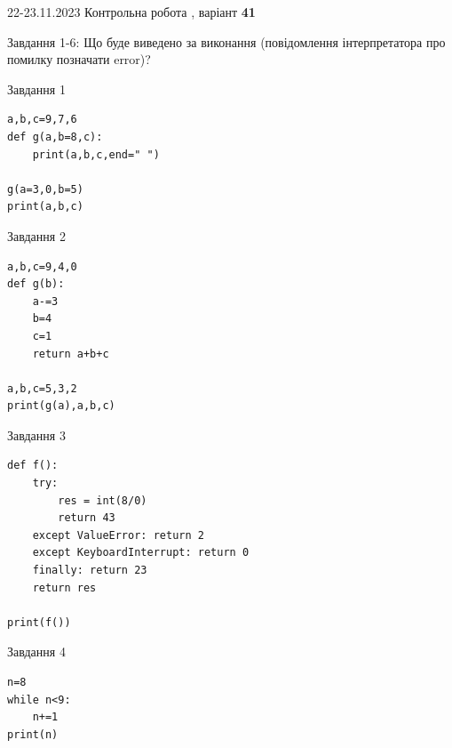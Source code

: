 \documentclass[12pt, ukrainian]{article}
\begin{document}
{{22-23.11.2023 Контрольна робота , варіант  \No \textbf { 41 }\par}}
{

Завдання 1-6: Що буде виведено за виконання (повідомлення інтерпретатора про помилку позначати error)?


\begin{minipage}[t]{9.7cm}                
{\begin{center}Завдання {1}\end{center}}
\begin{verbatim}
a,b,c=9,7,6
def g(a,b=8,c):
    print(a,b,c,end=" ")

g(a=3,0,b=5)
print(a,b,c)
\end{verbatim}     
\end{minipage}
\vline \hspace{8mm}
\begin{minipage}[t]{8.0cm}                
{\begin{center}Завдання {2}\end{center}}
\begin{verbatim}
a,b,c=9,4,0
def g(b):
    a-=3
    b=4
    c=1
    return a+b+c

a,b,c=5,3,2
print(g(a),a,b,c)
\end{verbatim}     
\end{minipage}

\vspace{15mm}
\begin{minipage}[t]{9.7cm}                
{\begin{center}Завдання {3}\end{center}}
\begin{verbatim}
def f():
    try:
        res = int(8/0)
        return 43
    except ValueError: return 2
    except KeyboardInterrupt: return 0
    finally: return 23
    return res

print(f())
\end{verbatim}     
\end{minipage}
\vline \hspace{8mm}
\begin{minipage}[t]{8.0cm}                
{\begin{center}Завдання {4}\end{center}}
\begin{verbatim}
n=8
while n<9:
    n+=1
print(n)
\end{verbatim}     
\end{minipage}

}
\end{document}
